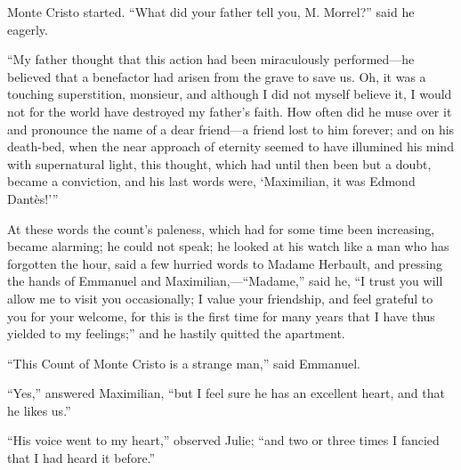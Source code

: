 Monte Cristo started. “What did your father tell you, M. Morrel?” said
he eagerly.

“My father thought that this action had been miraculously performed—he
believed that a benefactor had arisen from the grave to save us. Oh, it
was a touching superstition, monsieur, and although I did not myself
believe it, I would not for the world have destroyed my father’s faith.
How often did he muse over it and pronounce the name of a dear friend—a
friend lost to him forever; and on his death-bed, when the near
approach of eternity seemed to have illumined his mind with
supernatural light, this thought, which had until then been but a
doubt, became a conviction, and his last words were, ‘Maximilian, it
was Edmond Dantès!’”

At these words the count’s paleness, which had for some time been
increasing, became alarming; he could not speak; he looked at his watch
like a man who has forgotten the hour, said a few hurried words to
Madame Herbault, and pressing the hands of Emmanuel and
Maximilian,—“Madame,” said he, “I trust you will allow me to visit you
occasionally; I value your friendship, and feel grateful to you for
your welcome, for this is the first time for many years that I have
thus yielded to my feelings;” and he hastily quitted the apartment.

“This Count of Monte Cristo is a strange man,” said Emmanuel.

“Yes,” answered Maximilian, “but I feel sure he has an excellent heart,
and that he likes us.”

“His voice went to my heart,” observed Julie; “and two or three times I
fancied that I had heard it before.”
